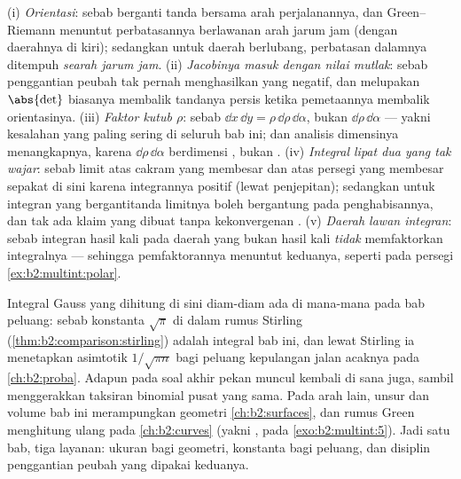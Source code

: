 \begin{remark}
(i) \emph{Orientasi}: sebab  berganti tanda bersama
arah perjalanannya, dan Green--Riemann menuntut perbatasannya
berlawanan arah jarum jam (dengan daerahnya di kiri); sedangkan untuk daerah berlubang,
perbatasan dalamnya ditempuh \emph{searah jarum jam}. (ii)
\emph{Jacobinya masuk dengan nilai mutlak}: sebab penggantian
peubah tak pernah menghasilkan  yang negatif, dan melupakan
$\abs{\det}$ biasanya membalik tandanya persis ketika pemetaannya
membalik orientasinya. (iii) \emph{Faktor kutub $\rho$}:
sebab $\dd x\,\dd y = \rho\,\dd\rho\,\dd\alpha$, bukan
$\dd\rho\,\dd\alpha$ --- yakni kesalahan yang paling sering di seluruh
bab ini; dan analisis dimensinya menangkapnya, karena
$\dd\rho\,\dd\alpha$ berdimensi , bukan
. (iv) \emph{Integral lipat dua yang tak wajar}: sebab limit atas
cakram yang membesar dan atas persegi yang membesar sepakat di sini karena
integrannya positif (lewat penjepitan); sedangkan untuk integran
yang bergantitanda limitnya boleh bergantung pada penghabisannya, dan tak ada
klaim yang dibuat tanpa kekonvergenan . (v)
\emph{Daerah lawan integran}: sebab integran hasil kali pada daerah
yang bukan hasil kali \emph{tidak} memfaktorkan integralnya ---
sehingga pemfaktorannya menuntut keduanya, seperti pada persegi
\cref{ex:b2:multint:polar}.
\end{remark}

\begin{remark}
Integral Gauss yang dihitung di sini diam-diam ada di mana-mana pada
bab peluang: sebab konstanta $\sqrt\pi$ di dalam
rumus Stirling (\cref{thm:b2:comparison:stirling}) adalah
integral bab ini, dan lewat Stirling ia menetapkan
asimtotik $1/\sqrt{\pi n}$ bagi peluang kepulangan jalan
acaknya pada \cref{ch:b2:proba}. Adapun  pada
soal akhir pekan muncul kembali di sana juga, sambil menggerakkan
taksiran binomial pusat yang sama. Pada arah lain, unsur 
dan volume bab ini merampungkan geometri
\cref{ch:b2:surfaces}, dan rumus Green menghitung ulang
  pada \cref{ch:b2:curves} (yakni , pada
\cref{exo:b2:multint:5}). Jadi satu bab, tiga layanan:
ukuran bagi geometri, konstanta bagi peluang, dan
disiplin penggantian peubah yang dipakai keduanya.
\end{remark}

